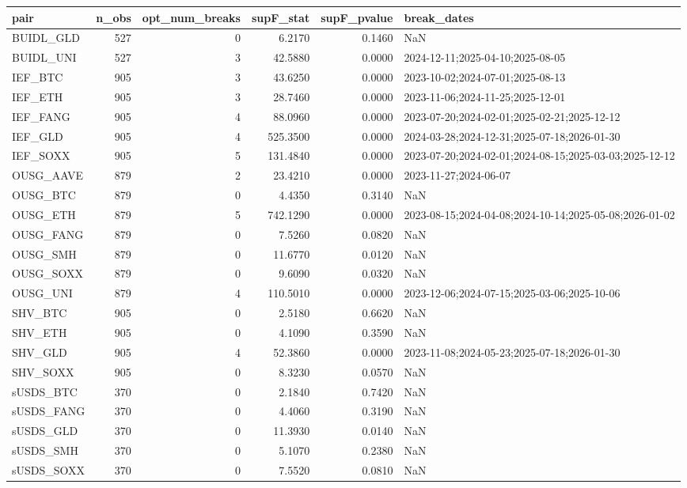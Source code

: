 \begin{tabular}{lrrrrl}
\toprule
pair & n\_obs & opt\_num\_breaks & supF\_stat & supF\_pvalue & break\_dates \\
\midrule
BUIDL\_GLD & 527 & 0 & 6.2170 & 0.1460 & NaN \\
BUIDL\_UNI & 527 & 3 & 42.5880 & 0.0000 & 2024-12-11;2025-04-10;2025-08-05 \\
IEF\_BTC & 905 & 3 & 43.6250 & 0.0000 & 2023-10-02;2024-07-01;2025-08-13 \\
IEF\_ETH & 905 & 3 & 28.7460 & 0.0000 & 2023-11-06;2024-11-25;2025-12-01 \\
IEF\_FANG & 905 & 4 & 88.0960 & 0.0000 & 2023-07-20;2024-02-01;2025-02-21;2025-12-12 \\
IEF\_GLD & 905 & 4 & 525.3500 & 0.0000 & 2024-03-28;2024-12-31;2025-07-18;2026-01-30 \\
IEF\_SOXX & 905 & 5 & 131.4840 & 0.0000 & 2023-07-20;2024-02-01;2024-08-15;2025-03-03;2025-12-12 \\
OUSG\_AAVE & 879 & 2 & 23.4210 & 0.0000 & 2023-11-27;2024-06-07 \\
OUSG\_BTC & 879 & 0 & 4.4350 & 0.3140 & NaN \\
OUSG\_ETH & 879 & 5 & 742.1290 & 0.0000 & 2023-08-15;2024-04-08;2024-10-14;2025-05-08;2026-01-02 \\
OUSG\_FANG & 879 & 0 & 7.5260 & 0.0820 & NaN \\
OUSG\_SMH & 879 & 0 & 11.6770 & 0.0120 & NaN \\
OUSG\_SOXX & 879 & 0 & 9.6090 & 0.0320 & NaN \\
OUSG\_UNI & 879 & 4 & 110.5010 & 0.0000 & 2023-12-06;2024-07-15;2025-03-06;2025-10-06 \\
SHV\_BTC & 905 & 0 & 2.5180 & 0.6620 & NaN \\
SHV\_ETH & 905 & 0 & 4.1090 & 0.3590 & NaN \\
SHV\_GLD & 905 & 4 & 52.3860 & 0.0000 & 2023-11-08;2024-05-23;2025-07-18;2026-01-30 \\
SHV\_SOXX & 905 & 0 & 8.3230 & 0.0570 & NaN \\
sUSDS\_BTC & 370 & 0 & 2.1840 & 0.7420 & NaN \\
sUSDS\_FANG & 370 & 0 & 4.4060 & 0.3190 & NaN \\
sUSDS\_GLD & 370 & 0 & 11.3930 & 0.0140 & NaN \\
sUSDS\_SMH & 370 & 0 & 5.1070 & 0.2380 & NaN \\
sUSDS\_SOXX & 370 & 0 & 7.5520 & 0.0810 & NaN \\
\bottomrule
\end{tabular}
